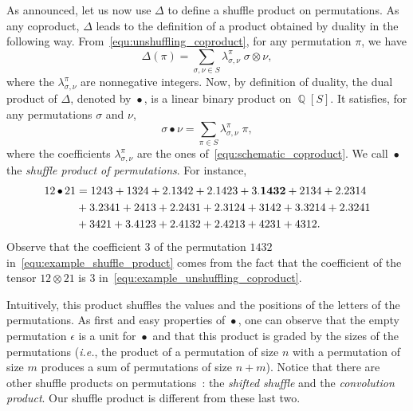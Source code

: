 \documentclass[a4paper]{llncs}
\DeclareMathOperator{\QQ}{\mathbb{Q}}
\DeclareMathOperator{\SHUFFLE}{\bullet}
\begin{document}
As announced, let us now use $\Delta$ to define a shuffle product on
permutations. As any coproduct, $\Delta$ leads to the definition of a
product obtained by duality in the following way.
From~\eqref{equ:unshuffling_coproduct}, for any permutation $\pi$, we
have
\begin{equation} \label{equ:schematic_coproduct}
    \Delta(\pi) =
    \sum_{\sigma, \nu \in S} \lambda_{\sigma, \nu}^\pi \;
    \sigma \otimes \nu,
\end{equation}
where the $\lambda_{\sigma, \nu}^\pi$ are nonnegative integers. Now,
by definition of duality, the dual product of $\Delta$, denoted by
$\SHUFFLE$, is a linear binary product on $\QQ[S]$. It satisfies, for
any permutations $\sigma$ and $\nu$,
\begin{equation}
    \sigma \SHUFFLE \nu =
    \sum_{\pi \in S}
    \lambda_{\sigma, \nu}^\pi \; \pi,
\end{equation}
where the coefficients $\lambda_{\sigma, \nu}^\pi$ are the ones
of~\eqref{equ:schematic_coproduct}. We call $\SHUFFLE$ the
\emph{shuffle product of permutations}. For instance,
\begin{equation}\begin{split} \label{equ:example_shuffle_product}
    12 \SHUFFLE 21 & =
    1243 + 1324 + 2.1342 + 2.1423 + 3. {\bf 1432} + 2134 + 2.2314 \\
    & + 3.2341 + 2413 + 2.2431 + 2.3124 + 3142 + 3.3214 + 2.3241 \\
    & + 3421 + 3.4123 + 2.4132 + 2.4213 + 4231 + 4312.
\end{split}\end{equation}
Observe that the coefficient $3$ of the permutation $1432$
in~\eqref{equ:example_shuffle_product} comes from the fact that the
coefficient of the tensor $12 \otimes 21$ is $3$
in~\eqref{equ:example_unshuffling_coproduct}.
\medskip

Intuitively, this product shuffles the values and the positions of the
letters of the permutations. As first and easy properties of $\SHUFFLE$,
one can observe that the empty permutation $\epsilon$ is a unit for
$\SHUFFLE$ and that this product is graded by the sizes of the
permutations (\emph{i.e.}, the product of a permutation of size $n$ with
a permutation of size $m$ produces a sum of permutations of size $n + m$).
Notice that there are other shuffle products on
permutations~\cite{DHT:IJAC:2002}: the \emph{shifted shuffle} and the
\emph{convolution product}. Our shuffle product is different from these
last two.
\medskip
\end{document}
